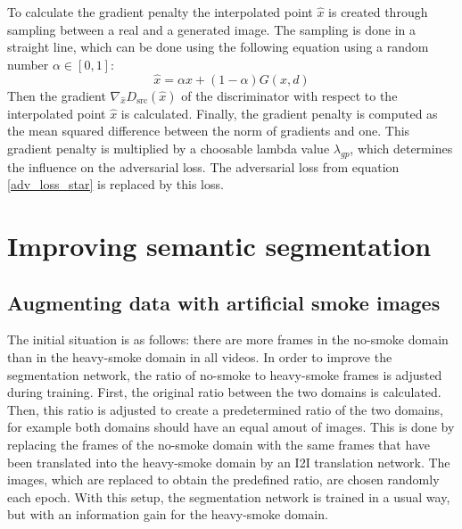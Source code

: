 To calculate the gradient penalty the interpolated point $\hat{x}$ is created through sampling between a real and a generated image.
The sampling is done in a straight line, which can be done using the following equation using a random number $\alpha \in [0, 1]$:
\begin{equation}
    \hat{x} = \alpha x + (1 - \alpha)G(x,d)
    \label{interpolated}
\end{equation}
Then the gradient $\nabla_{\hat{x}}D_{\text{src}}(\hat{x})$ of the discriminator with respect to the interpolated point $\hat{x}$ is calculated.
Finally, the gradient penalty is computed as the mean squared difference between the norm of gradients and one.
This gradient penalty is multiplied by a choosable lambda value $\lambda_{gp}$, which determines the influence on the adversarial loss.
The adversarial loss from equation \ref{adv_loss_star} is replaced by this loss.

\section{Improving semantic segmentation}\label{seg_improve_gen}
\subsection{Augmenting data with artificial smoke images}
The initial situation is as follows: there are more frames in the no-smoke domain than in the heavy-smoke domain in all videos.
In order to improve the segmentation network, the ratio of no-smoke to heavy-smoke frames is adjusted during training.
First, the original ratio between the two domains is calculated. 
Then, this ratio is adjusted to create a predetermined ratio of the two domains, for example both domains should have an equal amout of images.
This is done by replacing the frames of the no-smoke domain with the same frames that have been translated into the heavy-smoke domain by an I2I translation network.
The images, which are replaced to obtain the predefined ratio, are chosen randomly each epoch.
With this setup, the segmentation network is trained in a usual way, but with an information gain for the heavy-smoke domain.
